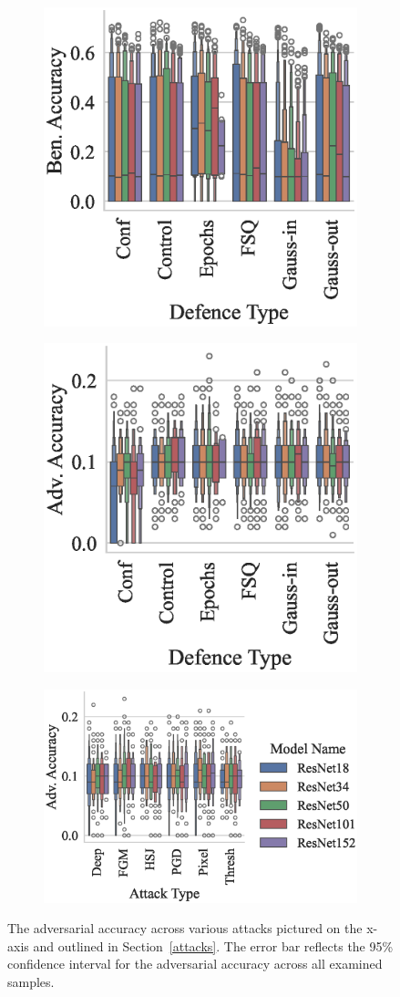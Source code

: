 \begin{figure}[!h]
\begin{subfigure}
    \centering
    \includegraphics[width=.26\textwidth]{cifar/ben_accuracy_vs_defence_type.eps}
\end{subfigure}
\begin{subfigure}
    \centering
    \includegraphics[width=.26\textwidth]{cifar/adv_accuracy_vs_defence_type.eps}
\end{subfigure}
\begin{subfigure}
    \centering
    \includegraphics[width=.38\textwidth]{cifar/adv_accuracy_vs_attack_type.eps}
\end{subfigure}
\caption{The adversarial accuracy across various attacks pictured on the x-axis and outlined in Section~\ref{attacks}. The error bar reflects the 95\% confidence interval for the adversarial accuracy across all examined samples.}
\label{fig:cifar_accuracies}
\end{figure}

